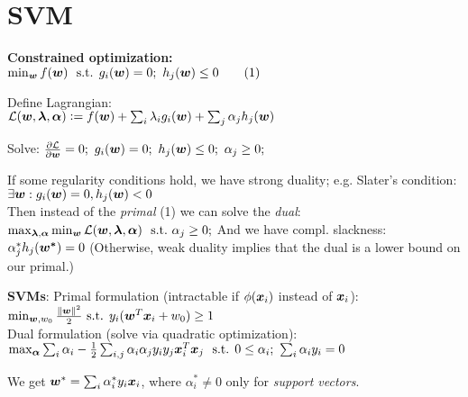 
\section{SVM}
\textbf{Constrained optimization:}\\
$\min_{\boldsymbol{w}} f(\boldsymbol{w})\ \text{ s.t. } g_i(\boldsymbol{w}) = 0;\ h_j(\boldsymbol{w}) \leq 0 \quad\quad (1)$

Define Lagrangian:\\
$
\mathcal{L}(\boldsymbol{w}, \boldsymbol{\lambda}, \boldsymbol{\alpha})
\vcentcolon=
f(\boldsymbol{w}) + \sum_i \lambda_i g_i(\boldsymbol{w}) + \sum_j \alpha_j h_j(\boldsymbol{w})
$

Solve:
$
\frac{\partial \mathcal{L}}{\partial \b{w}} = 0;\ 
g_i(\b{w}) = 0;\ 
h_j(\b{w}) \leq 0;\ 
\alpha_j \geq 0;\ 
$

If some regularity conditions hold, we have strong duality; e.g. Slater's condition:\\
$
\exists \boldsymbol{w}: g_i(\boldsymbol{w}) = 0, h_j(\boldsymbol{w}) < 0
$\\
Then instead of the \textit{primal} (1) we can solve the \textit{dual}:
$
\max_{\boldsymbol{\lambda}, \boldsymbol{\alpha}} \min_{\boldsymbol{w}} \mathcal{L}(\boldsymbol{w}, \boldsymbol{\lambda}, \boldsymbol{\alpha})
\ \text{ s.t.}\ \alpha_j \geq 0;
$
And we have compl. slackness: $\alpha_j^* h_j(\boldsymbol{w^*}) = 0$
(Otherwise, weak duality implies that the dual is a lower bound on our primal.)

\textbf{SVMs}: Primal formulation (intractable if $\phi(\boldsymbol{x}_i)$ instead of $\boldsymbol{x}_i$):\\
$
\min_{\boldsymbol{w}, w_0} \frac{\left\lVert\boldsymbol{w}\right\rVert^2}{2}
 \text{ s.t. }
y_i(\boldsymbol{w}^T \boldsymbol{x}_i + w_0) \geq 1
$\\
Dual formulation (solve via quadratic optimization):
$
\max_{\boldsymbol{\alpha}} \sum_i \alpha_i - \frac{1}{2} \sum_{i,j} \alpha_i \alpha_j y_i y_j \boldsymbol{x}_i^T \boldsymbol{x}_j
\\
\ \text{ s.t. } 0 \leq \alpha_i;\ \sum_i \alpha_i y_i = 0
$

We get $\boldsymbol{w}^* = \sum_i \alpha_i^* y_i \boldsymbol{x}_i$, where $\alpha_i^* \neq 0$ only for \textit{support vectors}.

